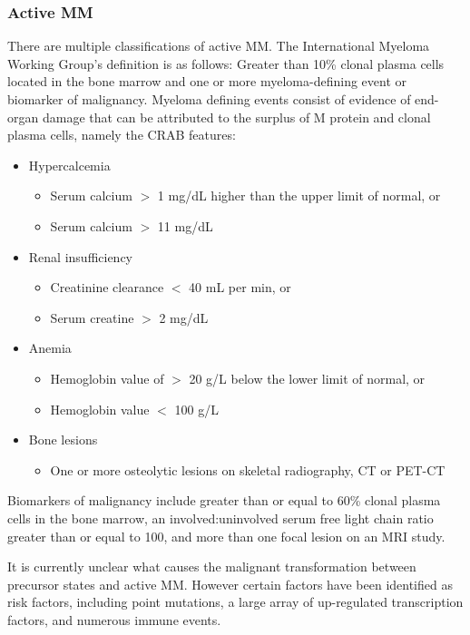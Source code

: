 \subsubsection{Active MM}
There are multiple classifications of active MM.
The International Myeloma Working Group's definition\cite{rajkumar2014international} is as follows:
Greater than 10\% clonal plasma cells located in the bone marrow and one or more myeloma-defining event or biomarker of malignancy.
Myeloma defining events consist of evidence of end-organ damage that can be attributed to the surplus of M protein and clonal plasma cells, namely the CRAB features:
%
\begin{itemize}
  \item Hypercalcemia
    \begin{itemize}
        \item Serum calcium $>$ 1 mg/dL higher than the upper limit of normal, or
        \item Serum calcium $>$ 11 mg/dL
    \end{itemize}
  \item Renal insufficiency
    \begin{itemize}
        \item Creatinine clearance $<$ 40 mL per min, or
        \item Serum creatine $>$ 2 mg/dL
  \end{itemize}
  \item Anemia
    \begin{itemize}
        \item Hemoglobin value of $>$  20 g/L below the lower limit of normal, or
        \item Hemoglobin value $<$ 100 g/L
    \end{itemize}
    \item Bone lesions
      \begin{itemize}
        \item One or more osteolytic lesions on skeletal radiography, CT or PET-CT
        \end{itemize}
\end{itemize}
%

\noindent
Biomarkers of malignancy include greater than or equal to 60\% clonal plasma cells in the bone marrow, an involved:uninvolved serum free light chain ratio greater than or equal to 100, and more than one focal lesion on an MRI study\cite{rajkumar2014international}.

It is currently unclear what causes the malignant transformation between precursor states and active MM\@.
However certain factors have been identified as risk factors, including point mutations, a large array of up-regulated transcription factors, and numerous immune events.

